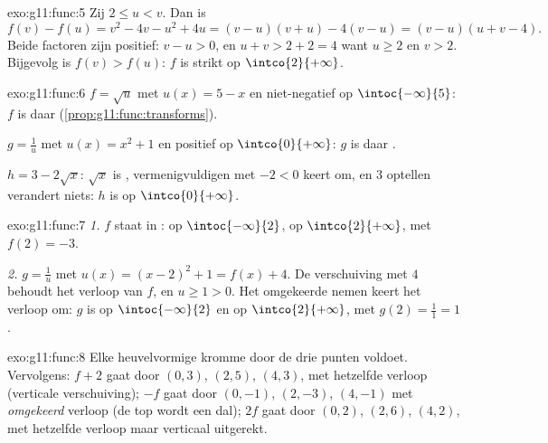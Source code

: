 \begin{solution}{exo:g11:func:5}
Zij $2 \leq u < v$. Dan is
\[
f(v) - f(u) = v^2 - 4v - u^2 + 4u = (v-u)(v+u) - 4(v-u)
= (v - u)(u + v - 4).
\]
Beide factoren zijn positief: $v - u > 0$, en $u + v > 2 + 2 = 4$ want
$u \geq 2$ en $v > 2$. Bijgevolg is $f(v) > f(u)$: $f$ is strikt  op
$\intco{2}{+\infty}$.
\end{solution}

\begin{solution}{exo:g11:func:6}
$f = \sqrt{u}$ met $u(x) = 5 - x$  en niet-negatief op
$\intoc{-\infty}{5}$: $f$ is daar 
(\cref{prop:g11:func:transforms}).

$g = \frac1u$ met $u(x) = x^2 + 1$  en positief op
$\intco{0}{+\infty}$: $g$ is daar .

$h = 3 - 2\sqrt x$: $\sqrt x$ is , vermenigvuldigen met $-2 < 0$
keert om, en $3$ optellen verandert niets: $h$ is  op
$\intco{0}{+\infty}$.
\end{solution}

\begin{solution}{exo:g11:func:7}
\emph{1.} $f$ staat in :  op $\intoc{-\infty}{2}$,
 op $\intco{2}{+\infty}$, met  $f(2) = -3$.

\emph{2.} $g = \frac{1}{u}$ met $u(x) = (x-2)^2 + 1 = f(x) + 4$. De
verschuiving met $4$ behoudt het verloop van $f$, en $u \geq 1 > 0$. Het
omgekeerde nemen keert het verloop om: $g$ is  op
$\intoc{-\infty}{2}$ en  op $\intco{2}{+\infty}$, met 
$g(2) = \frac{1}{1} = 1$.
\end{solution}

\begin{solution}{exo:g11:func:8}
Elke heuvelvormige kromme door de drie punten voldoet. Vervolgens: $f + 2$
gaat door $(0,3)$, $(2,5)$, $(4,3)$, met hetzelfde verloop (verticale
verschuiving); $-f$ gaat door $(0,-1)$, $(2,-3)$, $(4,-1)$ met
\emph{omgekeerd} verloop (de top wordt een dal); $2f$ gaat door $(0,2)$,
$(2,6)$, $(4,2)$, met hetzelfde verloop maar verticaal uitgerekt.
\end{solution}

